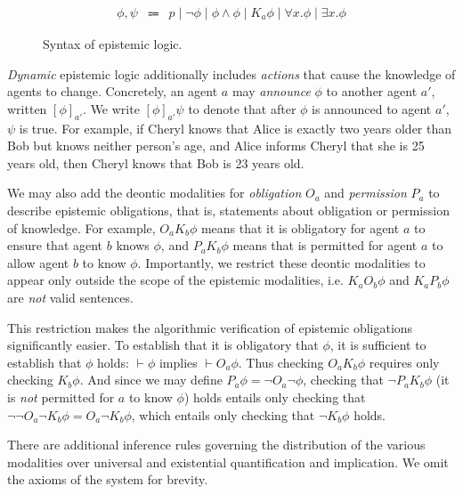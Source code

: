\documentclass[letterpaper,twocolumn,10pt]{article}
\begin{document}
\begin{figure}[ht]
  \centering
  \[\begin{array}{rcl}
    \phi, \psi & \Coloneqq &
      p \mid
      \lnot \phi \mid
      \phi \land \phi \mid
      K_a \phi \mid
      \forall x. \phi \mid
      \exists x. \phi
  \end{array}\]
  \caption{Syntax of epistemic logic.}
  \label{fig:epistemic-logic}
\end{figure}

\emph{Dynamic} epistemic logic additionally includes \emph{actions} that cause the knowledge of
agents to change. Concretely, an agent \(a\) may \emph{announce} \(\phi\) to another agent \(a'\),
written \([\phi]_{a'}\). We write \([\phi]_{a'} \psi\) to denote that after \(\phi\) is announced to
agent \(a'\), \(\psi\) is true. For example, if Cheryl knows that Alice is exactly two years older
than Bob but knows neither person's age, and Alice informs Cheryl that she is 25 years old, then
Cheryl knows that Bob is 23 years old.

We may also add the deontic modalities for \emph{obligation} \(O_a\) and \emph{permission} \(P_a\)
to describe epistemic obligations, that is, statements about obligation or permission of knowledge.
For example, \(O_a K_b \phi\) means that it is obligatory for agent \(a\) to ensure that agent \(b\)
knows \(\phi\), and \(P_a K_b \phi\) means that is permitted for agent \(a\) to allow agent \(b\) to
know \(\phi\). Importantly, we restrict these deontic modalities to appear only outside the scope of
the epistemic modalities, i.e. \(K_a O_b \phi\) and \(K_a P_b \phi\) are \emph{not} valid sentences.

This restriction makes the algorithmic verification of epistemic obligations significantly easier.
To establish that it is obligatory that \(\phi\), it is sufficient to establish that \(\phi\) holds:
\(\vdash \phi\) implies \(\vdash O_a \phi\). Thus checking \(O_a K_b \phi\) requires only checking
\(K_b \phi\). And since we may define \(P_a \phi = \lnot O_a \lnot \phi\), checking that \(\lnot P_a
K_b \phi\) (it is \emph{not} permitted for \(a\) to know \(\phi\)) holds entails only checking that
\(\lnot \lnot O_a \lnot K_b \phi = O_a \lnot K_b \phi\), which entails only checking that  \(\lnot
K_b \phi\) holds.

There are additional inference rules governing the distribution of the various modalities over
universal and existential quantification and implication. We omit the axioms of the system for
brevity.
\end{document}
